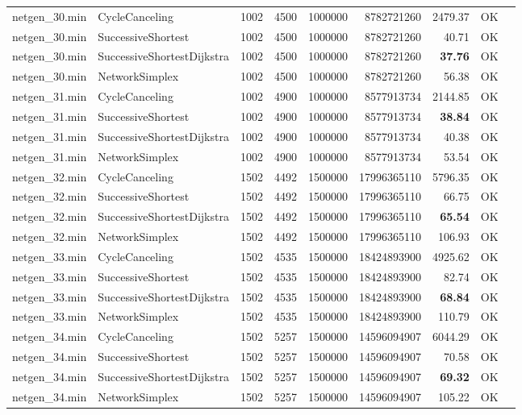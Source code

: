 \begin{longtable}{llrrrrrrl}
\midrule
netgen\_30.min & CycleCanceling & 1002 & 4500 & 1000000 & 8782721260 & 2479.37 & OK \\
netgen\_30.min & SuccessiveShortest & 1002 & 4500 & 1000000 & 8782721260 & 40.71 & OK \\
netgen\_30.min & SuccessiveShortestDijkstra & 1002 & 4500 & 1000000 & 8782721260 & \textbf{37.76} & OK \\
netgen\_30.min & NetworkSimplex & 1002 & 4500 & 1000000 & 8782721260 & 56.38 & OK \\
\midrule
netgen\_31.min & CycleCanceling & 1002 & 4900 & 1000000 & 8577913734 & 2144.85 & OK \\
netgen\_31.min & SuccessiveShortest & 1002 & 4900 & 1000000 & 8577913734 & \textbf{38.84} & OK \\
netgen\_31.min & SuccessiveShortestDijkstra & 1002 & 4900 & 1000000 & 8577913734 & 40.38 & OK \\
netgen\_31.min & NetworkSimplex & 1002 & 4900 & 1000000 & 8577913734 & 53.54 & OK \\
\midrule
netgen\_32.min & CycleCanceling & 1502 & 4492 & 1500000 & 17996365110 & 5796.35 & OK \\
netgen\_32.min & SuccessiveShortest & 1502 & 4492 & 1500000 & 17996365110 & 66.75 & OK \\
netgen\_32.min & SuccessiveShortestDijkstra & 1502 & 4492 & 1500000 & 17996365110 & \textbf{65.54} & OK \\
netgen\_32.min & NetworkSimplex & 1502 & 4492 & 1500000 & 17996365110 & 106.93 & OK \\
\midrule
netgen\_33.min & CycleCanceling & 1502 & 4535 & 1500000 & 18424893900 & 4925.62 & OK \\
netgen\_33.min & SuccessiveShortest & 1502 & 4535 & 1500000 & 18424893900 & 82.74 & OK \\
netgen\_33.min & SuccessiveShortestDijkstra & 1502 & 4535 & 1500000 & 18424893900 & \textbf{68.84} & OK \\
netgen\_33.min & NetworkSimplex & 1502 & 4535 & 1500000 & 18424893900 & 110.79 & OK \\
\midrule
netgen\_34.min & CycleCanceling & 1502 & 5257 & 1500000 & 14596094907 & 6044.29 & OK \\
netgen\_34.min & SuccessiveShortest & 1502 & 5257 & 1500000 & 14596094907 & 70.58 & OK \\
netgen\_34.min & SuccessiveShortestDijkstra & 1502 & 5257 & 1500000 & 14596094907 & \textbf{69.32} & OK \\
netgen\_34.min & NetworkSimplex & 1502 & 5257 & 1500000 & 14596094907 & 105.22 & OK \\

\end{longtable}
